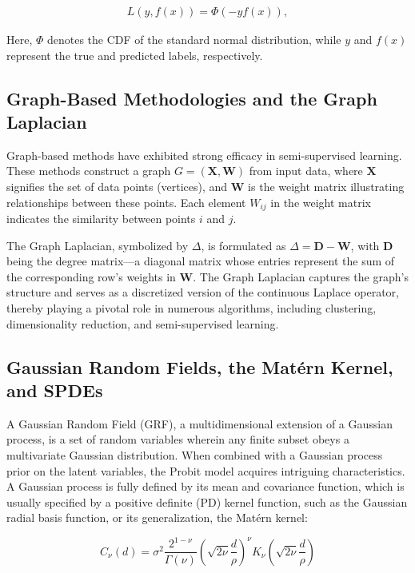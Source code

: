 \documentclass[11pt]{amsart}
\begin{document}
\begin{align*}
L(y, f(x)) = \Phi(-yf(x)),
\end{align*}

Here, $\Phi$ denotes the CDF of the standard normal distribution, while $y$ and $f(x)$ represent the true and predicted labels, respectively.

\subsection{Graph-Based Methodologies and the Graph Laplacian}\label{sec:graph_laplacian}

Graph-based methods have exhibited strong efficacy in semi-supervised learning. These methods construct a graph $G = (\mathbf{X}, \mathbf{W})$ from input data, where $\mathbf{X}$ signifies the set of data points (vertices), and $\mathbf{W}$ is the weight matrix illustrating relationships between these points. Each element $W_{ij}$ in the weight matrix indicates the similarity between points $i$ and $j$.

The Graph Laplacian, symbolized by $\Delta$, is formulated as $\Delta = \mathbf{D} - \mathbf{W}$, with $\mathbf{D}$ being the degree matrix—a diagonal matrix whose entries represent the sum of the corresponding row's weights in $\mathbf{W}$. The Graph Laplacian captures the graph's structure and serves as a discretized version of the continuous Laplace operator, thereby playing a pivotal role in numerous algorithms, including clustering, dimensionality reduction, and semi-supervised learning.

\subsection{Gaussian Random Fields, the Matérn Kernel, and SPDEs}\label{sec:grf_matern_spde}

A Gaussian Random Field (GRF), a multidimensional extension of a Gaussian process, is a set of random variables wherein any finite subset obeys a multivariate Gaussian distribution. When combined with a Gaussian process prior on the latent variables, the Probit model acquires intriguing characteristics. A Gaussian process is fully defined by its mean and covariance function, which is usually specified by a positive definite (PD) kernel function, such as the Gaussian radial basis function, or its generalization, the Matérn kernel:

$$C_\nu (d) = \sigma^2 \frac{2^{1-\nu}}{\Gamma(\nu)}\left( \sqrt{2\nu} \frac{d}{\rho} \right)^\nu K_\nu \left( \sqrt{2 \nu} \frac{d}{\rho}\right)$$
\end{document}
